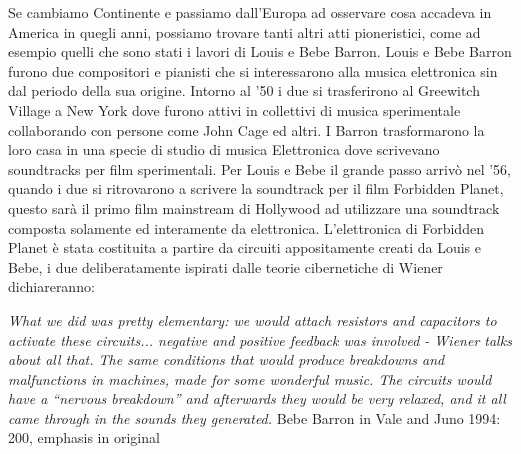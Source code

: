 Se cambiamo Continente e passiamo dall'Europa ad osservare cosa accadeva
in America in quegli anni, possiamo trovare tanti altri atti pioneristici,
come ad esempio quelli che sono stati i lavori di Louis e Bebe Barron.
Louis e Bebe Barron furono due compositori e pianisti che si
interessarono alla musica elettronica sin dal periodo della sua origine.
Intorno al '50 i due si trasferirono al Greewitch Village a New York
dove furono attivi in collettivi di musica sperimentale
collaborando con persone come John Cage ed altri.
I Barron trasformarono
la loro casa in una specie di studio di musica Elettronica
dove scrivevano soundtracks per film sperimentali.
Per Louis e Bebe il grande passo arrivò nel
'56, quando i due si ritrovarono a scrivere la soundtrack per il film
Forbidden Planet,
questo sarà il primo film mainstream di Hollywood ad utilizzare una soundtrack
composta solamente ed interamente da elettronica.
L'elettronica di Forbidden Planet è stata
costituita a partire da circuiti appositamente creati da Louis e Bebe,
i due deliberatamente ispirati dalle teorie cibernetiche di Wiener
dichiareranno:

\begin{center}
\vspace{0.5cm}
\textit{What we did was pretty elementary: we would attach resistors and capacitors
to activate these
circuits... negative and positive feedback was involved - Wiener
talks about all that. The same
conditions that would produce breakdowns and malfunctions in machines,
made for some
wonderful music. The circuits would have a “nervous breakdown”
and afterwards they would be
very relaxed, and it all came through in the sounds they generated.}
\vspace{0.5cm}
Bebe Barron in Vale and Juno 1994: 200, emphasis in original
\vspace{0.5cm}
\end{center}

